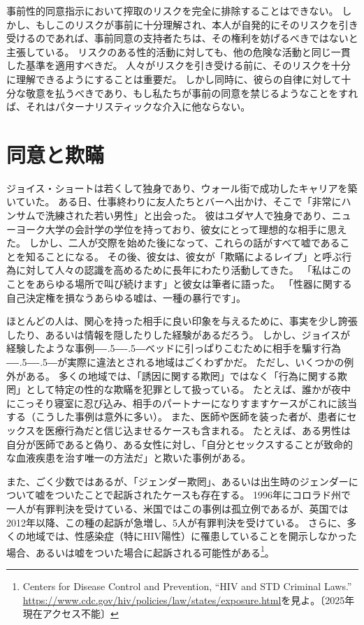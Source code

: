 \documentclass[paper=a4,book,openany]{jlreq}
\def\DDASH{―\kern-.5\zw―\kern-.5\zw―} %
\begin{document}
事前性的同意指示において搾取のリスクを完全に排除することはできない。
しかし、もしこのリスクが事前に十分理解され、本人が自発的にそのリスクを引き受けるのであれば、事前同意の支持者たちは、その権利を妨げるべきではないと主張している。
リスクのある性的活動に対しても、他の危険な活動と同じ一貫した基準を適用すべきだ。
人々がリスクを引き受ける前に、そのリスクを十分に理解できるようにすることは重要だ。
しかし同時に、彼らの自律に対して十分な敬意を払うべきであり、もし私たちが事前の同意を禁じるようなことをすれば、それはパターナリスティックな介入に他ならない。

\section{同意と欺瞞}

ジョイス・ショートは若くして独身であり、ウォール街で成功したキャリアを築いていた。
ある日、仕事終わりに友人たちとバーへ出かけ、そこで「非常にハンサムで洗練された若い男性」と出会った。
彼はユダヤ人で独身であり、ニューヨーク大学の会計学の学位を持っており、彼女にとって理想的な相手に思えた。
しかし、二人が交際を始めた後になって、これらの話がすべて嘘であることを知ることになる。
その後、彼女は、彼女が「欺瞞によるレイプ」と呼ぶ行為に対して人々の認識を高めるために長年にわたり活動してきた。
「私はこのことをあらゆる場所で叫び続けます」と彼女は筆者に語った。
「性器に関する自己決定権を損なうあらゆる嘘は、一種の暴行です」\citep{mcarthur16:_is_lying_get_laid_form_sexual_assaul}。

ほとんどの人は、関心を持った相手に良い印象を与えるために、事実を少し誇張したり、あるいは情報を隠したりした経験があるだろう。
しかし、ジョイスが経験したような事例{\DDASH}ベッドに引っぱりこむために相手を騙す行為{\DDASH}が実際に違法とされる地域はごくわずかだ。
ただし、いくつかの例外がある。
多くの地域では、「誘因に関する欺罔」ではなく「行為に関する欺罔」として特定の性的な欺瞞を犯罪として扱っている。
たとえば、誰かが夜中にこっそり寝室に忍び込み、相手のパートナーになりすますケースがこれに該当する（こうした事例は意外に多い）。
また、医師や医師を装った者が、患者にセックスを医療行為だと信じ込ませるケースも含まれる。
たとえば、ある男性は自分が医師であると偽り、ある女性に対し、「自分とセックスすることが致命的な血液疾患を治す唯一の方法だ」と欺いた事例がある\citep{chavez87:_woman_says_ruse_trick_her_sex}。

また、ごく少数ではあるが、「ジェンダー欺罔」、あるいは出生時のジェンダーについて嘘をついたことで起訴されたケースも存在する。
1996年にコロラド州で一人が有罪判決を受けている、米国ではこの事例は孤立例であるが、英国では2012年以降、この種の起訴が急増し、5人が有罪判決を受けている\citep{wilkinson17:_troub_case_uk_woman_convic_gender_fraud}。
さらに、多くの地域では、性感染症（特にHIV陽性）に罹患していることを開示しなかった場合、あるいは嘘をついた場合に起訴される可能性がある\footnote{Centers for Disease Control and Prevention, ``HIV and STD Criminal Laws.'' \url{https://www.cdc.gov/hiv/policies/law/states/exposure.html}を見よ。〔2025年現在アクセス不能〕}。
\end{document}
